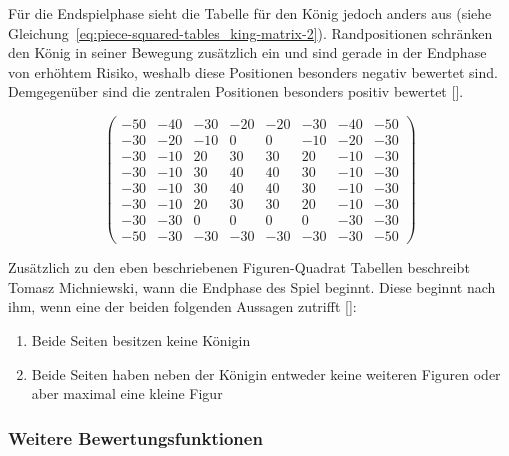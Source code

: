 \bigskip

\noindent Für die Endspielphase sieht die Tabelle für den König jedoch anders aus (siehe Gleichung~\ref{eq:piece-squared-tables_king-matrix-2}).
Randpositionen schränken den König in seiner Bewegung zusätzlich ein und sind gerade in der Endphase von erhöhtem Risiko, weshalb diese Positionen besonders negativ bewertet sind.
Demgegenüber sind die zentralen Positionen besonders positiv bewertet [\cite{Wiki2018}].

\begin{equation} \label{eq:piece-squared-tables_king-matrix-2}
\begin{pmatrix}
-50 & -40 & -30 & -20 & -20 & -30 & -40 & -50 \\
-30 & -20 & -10 & 0 & 0 & -10 & -20 & -30 \\
-30 & -10 & 20 & 30 & 30 & 20 & -10 & -30 \\
-30 & -10 & 30 & 40 & 40 & 30 & -10 & -30 \\
-30 & -10 & 30 & 40 & 40 & 30 & -10 & -30 \\
-30 & -10 & 20 & 30 & 30 & 20 & -10 & -30 \\
-30 & -30 & 0 & 0 & 0 & 0 & -30 & -30 \\
-50 & -30 & -30 & -30 & -30 & -30 & -30 & -50
\end{pmatrix}
\end{equation}

\bigskip

\noindent Zusätzlich zu den eben beschriebenen Figuren-Quadrat Tabellen beschreibt Tomasz Michniewski, wann die Endphase des Spiel beginnt.
Diese beginnt nach ihm, wenn eine der beiden folgenden Aussagen zutrifft [\cite{Wiki2018}]:

\begin{enumerate}
    \item Beide Seiten besitzen keine Königin
    \item Beide Seiten haben neben der Königin entweder keine weiteren Figuren oder aber maximal eine kleine Figur
\end{enumerate}


\subsubsection{Weitere Bewertungsfunktionen}

